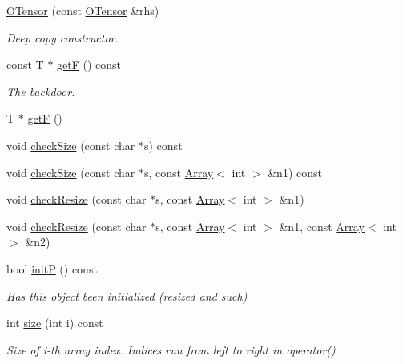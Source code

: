 \begin{DoxyCompactItemize}
\mbox{\hyperlink{classENSEM_1_1OTensor_aaf07253b5940da32a50af556d2f2afc6}{O\+Tensor}} (const \mbox{\hyperlink{classENSEM_1_1OTensor}{O\+Tensor}} \&rhs)
\begin{DoxyCompactList}\small\item\em Deep copy constructor. \end{DoxyCompactList}\item 
const T $\ast$ \mbox{\hyperlink{classENSEM_1_1OTensor_ac9462508146fa6ceba2797c9994ea54c}{getF}} () const
\begin{DoxyCompactList}\small\item\em The backdoor. \end{DoxyCompactList}\item 
T $\ast$ \mbox{\hyperlink{classENSEM_1_1OTensor_acaf63577c9d67fe58f649ae9fac008c1}{getF}} ()
\item 
void \mbox{\hyperlink{classENSEM_1_1OTensor_a09bfbf9385ec1bbe5050d4df43850f63}{check\+Size}} (const char $\ast$s) const
\item 
void \mbox{\hyperlink{classENSEM_1_1OTensor_ac59e6465eb9803b05edcdec04f8d2370}{check\+Size}} (const char $\ast$s, const \mbox{\hyperlink{classXMLArray_1_1Array}{Array}}$<$ int $>$ \&n1) const
\item 
void \mbox{\hyperlink{classENSEM_1_1OTensor_aa273eae7f1de4b37e91302da5edf279b}{check\+Resize}} (const char $\ast$s, const \mbox{\hyperlink{classXMLArray_1_1Array}{Array}}$<$ int $>$ \&n1)
\item 
void \mbox{\hyperlink{classENSEM_1_1OTensor_a0f656f8ef2b19a258a8c86a4e80ea902}{check\+Resize}} (const char $\ast$s, const \mbox{\hyperlink{classXMLArray_1_1Array}{Array}}$<$ int $>$ \&n1, const \mbox{\hyperlink{classXMLArray_1_1Array}{Array}}$<$ int $>$ \&n2)
\item 
bool \mbox{\hyperlink{classENSEM_1_1OTensor_a3f591732bdd0b358cde1069b21fbf1f5}{initP}} () const
\begin{DoxyCompactList}\small\item\em Has this object been initialized (resized and such) \end{DoxyCompactList}\item 
int \mbox{\hyperlink{classENSEM_1_1OTensor_aeb39779caeadcbcea94d9ef629913287}{size}} (int i) const
\begin{DoxyCompactList}\small\item\em Size of i-\/th array index. Indices run from left to right in operator() \end{DoxyCompactList}\item 

\end{DoxyCompactItemize}
